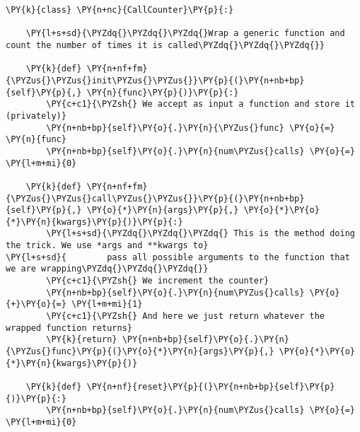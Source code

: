 \begin{Verbatim}[label=\makebox{\url{https://bitbucket.org/lbaldini/programming/src/tip/snippets/callable.py}},commandchars=\\\{\}]
\PY{k}{class} \PY{n+nc}{CallCounter}\PY{p}{:}
  
    \PY{l+s+sd}{\PYZdq{}\PYZdq{}\PYZdq{}Wrap a generic function and count the number of times it is called\PYZdq{}\PYZdq{}\PYZdq{}}
    
    \PY{k}{def} \PY{n+nf+fm}{\PYZus{}\PYZus{}init\PYZus{}\PYZus{}}\PY{p}{(}\PY{n+nb+bp}{self}\PY{p}{,} \PY{n}{func}\PY{p}{)}\PY{p}{:}
        \PY{c+c1}{\PYZsh{} We accept as input a function and store it (privately)}
        \PY{n+nb+bp}{self}\PY{o}{.}\PY{n}{\PYZus{}func} \PY{o}{=} \PY{n}{func}
        \PY{n+nb+bp}{self}\PY{o}{.}\PY{n}{num\PYZus{}calls} \PY{o}{=} \PY{l+m+mi}{0}
    
    \PY{k}{def} \PY{n+nf+fm}{\PYZus{}\PYZus{}call\PYZus{}\PYZus{}}\PY{p}{(}\PY{n+nb+bp}{self}\PY{p}{,} \PY{o}{*}\PY{n}{args}\PY{p}{,} \PY{o}{*}\PY{o}{*}\PY{n}{kwargs}\PY{p}{)}\PY{p}{:}
        \PY{l+s+sd}{\PYZdq{}\PYZdq{}\PYZdq{} This is the method doing the trick. We use *args and **kwargs to}
\PY{l+s+sd}{        pass all possible arguments to the function that we are wrapping\PYZdq{}\PYZdq{}\PYZdq{}}
        \PY{c+c1}{\PYZsh{} We increment the counter}
        \PY{n+nb+bp}{self}\PY{o}{.}\PY{n}{num\PYZus{}calls} \PY{o}{+}\PY{o}{=} \PY{l+m+mi}{1}
        \PY{c+c1}{\PYZsh{} And here we just return whatever the wrapped function returns}
        \PY{k}{return} \PY{n+nb+bp}{self}\PY{o}{.}\PY{n}{\PYZus{}func}\PY{p}{(}\PY{o}{*}\PY{n}{args}\PY{p}{,} \PY{o}{*}\PY{o}{*}\PY{n}{kwargs}\PY{p}{)}
    
    \PY{k}{def} \PY{n+nf}{reset}\PY{p}{(}\PY{n+nb+bp}{self}\PY{p}{)}\PY{p}{:}
        \PY{n+nb+bp}{self}\PY{o}{.}\PY{n}{num\PYZus{}calls} \PY{o}{=} \PY{l+m+mi}{0}
\end{Verbatim}